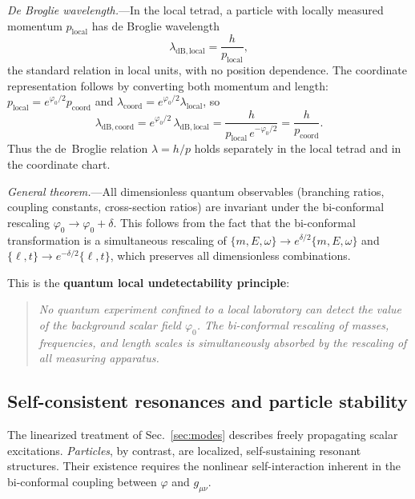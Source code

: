 \documentclass[aps,prd,onecolumn,superscriptaddress,nofootinbib,showpacs,12pt,notitlepage]{revtex4-2}
\begin{document}
\textit{De Broglie wavelength.}---In the local tetrad,
a particle with locally measured momentum
$p_{\mathrm{local}}$ has de Broglie wavelength
\begin{equation}
  \lambda_{\mathrm{dB,local}}
  = \frac{h}{p_{\mathrm{local}}},
\end{equation}
the standard relation in local units, with no position
dependence.  The coordinate representation follows by
converting both momentum and length:
$p_{\mathrm{local}}=e^{\varphi_0/2}p_{\mathrm{coord}}$
and
$\lambda_{\mathrm{coord}}=e^{\varphi_0/2}
\lambda_{\mathrm{local}}$, so
\begin{equation}
  \lambda_{\mathrm{dB,coord}}
  = e^{\varphi_0/2}\,\lambda_{\mathrm{dB,local}}
  = \frac{h}{p_{\mathrm{local}}\,e^{-\varphi_0/2}}
  = \frac{h}{p_{\mathrm{coord}}}.
\end{equation}
Thus the de~Broglie relation $\lambda=h/p$ holds
separately in the local tetrad and in the coordinate chart.

\textit{General theorem.}---All dimensionless quantum
observables (branching ratios, coupling constants,
cross-section ratios) are invariant under the
bi-conformal rescaling $\varphi_0 \to \varphi_0 + \delta$.
This follows from the fact that the bi-conformal
transformation is a simultaneous rescaling of
$\{m, E, \omega\} \to e^{\delta/2}\{m, E, \omega\}$ and
$\{\ell, t\} \to e^{-\delta/2}\{\ell, t\}$,
which preserves all dimensionless combinations.

This is the \textbf{quantum local undetectability principle}:
\begin{quote}
\textit{No quantum experiment confined to a local laboratory
can detect the value of the background scalar field $\varphi_0$.
The bi-conformal rescaling of masses, frequencies, and
length scales is simultaneously absorbed by the rescaling
of all measuring apparatus.}
\end{quote}

\subsection{Self-consistent resonances and particle stability}
\label{sec:resonances}

The linearized treatment of Sec.~\ref{sec:modes} describes
freely propagating scalar excitations.  \emph{Particles},
by contrast, are localized, self-sustaining resonant
structures.  Their existence requires the nonlinear
self-interaction inherent in the bi-conformal coupling
between $\varphi$ and $g_{\mu\nu}$.
\end{document}
